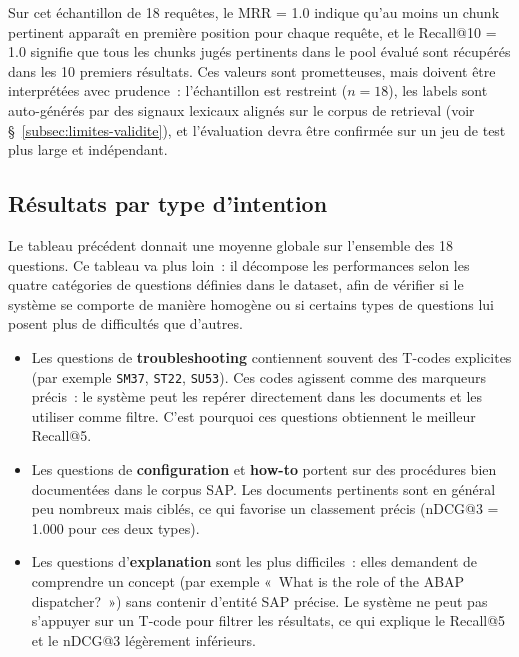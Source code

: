 Sur cet échantillon de 18 requêtes, le MRR = 1.0 indique qu'au moins un chunk pertinent apparaît en première position pour chaque requête, et le Recall@10 = 1.0 signifie que tous les chunks jugés pertinents dans le pool évalué sont récupérés dans les 10 premiers résultats. Ces valeurs sont prometteuses, mais doivent être interprétées avec prudence~: l'échantillon est restreint ($n = 18$), les labels sont auto-générés par des signaux lexicaux alignés sur le corpus de retrieval (voir §~\ref{subsec:limites-validite}), et l'évaluation devra être confirmée sur un jeu de test plus large et indépendant.

\subsection{Résultats par type d'intention}

Le tableau précédent donnait une moyenne globale sur l'ensemble des 18 questions. Ce tableau va plus loin~: il décompose les performances selon les quatre catégories de questions définies dans le dataset, afin de vérifier si le système se comporte de manière homogène ou si certains types de questions lui posent plus de difficultés que d'autres.

\begin{itemize}
  \item Les questions de \textbf{troubleshooting} contiennent souvent des T-codes explicites (par exemple \texttt{SM37}, \texttt{ST22}, \texttt{SU53}). Ces codes agissent comme des marqueurs précis~: le système peut les repérer directement dans les documents et les utiliser comme filtre. C'est pourquoi ces questions obtiennent le meilleur Recall@5.
  \item Les questions de \textbf{configuration} et \textbf{how-to} portent sur des procédures bien documentées dans le corpus SAP. Les documents pertinents sont en général peu nombreux mais ciblés, ce qui favorise un classement précis (nDCG@3 = 1.000 pour ces deux types).
  \item Les questions d'\textbf{explanation} sont les plus difficiles~: elles demandent de comprendre un concept (par exemple «~What is the role of the ABAP dispatcher?~») sans contenir d'entité SAP précise. Le système ne peut pas s'appuyer sur un T-code pour filtrer les résultats, ce qui explique le Recall@5 et le nDCG@3 légèrement inférieurs.
\end{itemize}


